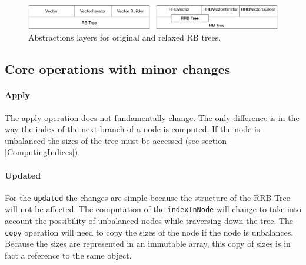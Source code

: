 \begin{figure}[h!]
  \centering
  \includegraphics[width=\textwidth]{Figures/AbstractionsLayers}
  \caption{Abstractions layers for original and relaxed RB trees.}
  \label{AbstractionsLayers}
\end{figure}

\subsection{Core operations with minor changes}

\paragraph{Apply}
The apply operation does not fundamentally change. The only difference is in the way the index of the next branch of a node is computed. If the node is unbalanced the sizes of the tree must be accessed (see section \ref{ComputingIndices}).



\paragraph{Updated}
For the \texttt{updated} the changes are simple because the structure of the RRB-Tree will not be affected. The computation of the \texttt{indexInNode} will change to take into account the possibility of unbalanced nodes while traversing down the tree. The \texttt{copy} operation will need to copy the sizes of the node if the node is unbalances. Because the sizes are represented in an immutable array, this copy of sizes is in fact a reference to the same object.


